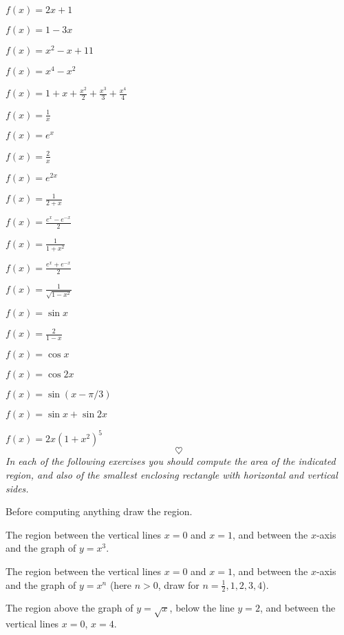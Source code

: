 \begin{multicols}{2}
\problem $\displaystyle f(x) = 2x+1 $

\problem $\displaystyle f(x) = 1-3x $

\problem $\displaystyle f(x) = x^2-x+11 $

\problem $\displaystyle f(x) = x^4-x^2 $

\problem $\displaystyle f(x) = 1+x+\frac{x^2}{2}+\frac{x^3}{3}+\frac{x^4}{4} $

\problem $\displaystyle f(x) = \frac1x $

\problem $\displaystyle f(x) = e^x $

\problem $\displaystyle f(x) = \frac2x $

\problem $\displaystyle f(x) = e^{2x} $

\problem $\displaystyle f(x) = \frac1{2+x} $

\problem $\displaystyle f(x) = \frac{e^x-e^{-x}}2 $

\problem $\displaystyle f(x) = \frac1{1+x^2} $

\problem $\displaystyle f(x) = \frac{e^x+e^{-x}}2 $

\problem $\displaystyle f(x) = \frac1{\sqrt{1-x^2}} $

\problem $\displaystyle f(x) = \sin x $

\problem $\displaystyle f(x) = \frac2{1-x} $

\problem $\displaystyle f(x) = \cos x $

\problem $\displaystyle f(x) = \cos2x $

\problem $\displaystyle f(x) = \sin(x-\pi/3) $

\problem $\displaystyle f(x) = \sin x + \sin 2x $

\problem $\displaystyle f(x) = 2x(1+x^2)^5$
\[
\heartsuit
\]
\begingroup
  \itshape In each of the following exercises you should compute the area
  of the indicated region, and also of the smallest enclosing rectangle
  with horizontal and vertical sides.

  Before computing anything draw the region.
\endgroup

\problem The region between the vertical lines $x=0$ and $x=1$, and between the
$x$-axis and the graph of $y=x^3$.

\problem The region between the vertical lines $x=0$ and $x=1$, and between the
$x$-axis and the graph of $y=x^n$ (here $n>0$, draw for $n=\frac12, 1,
2, 3, 4$).

\problem The region above the graph of $y=\sqrt x$, below the line $y=2$, and
between the vertical lines $x=0$, $x=4$.


\end{multicols}
